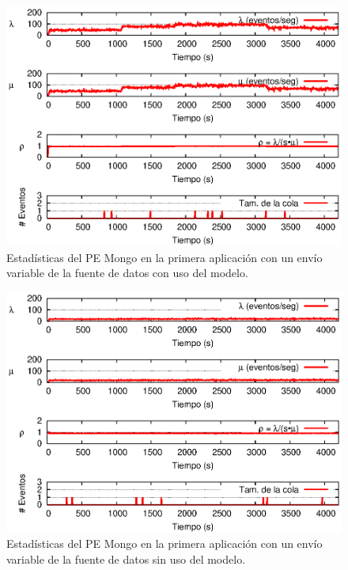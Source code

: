 \begin{figure}[!ht]
\centering
    \includegraphics[scale=1.1]{images/exp/app1/normal/cm/statusMongoPE.eps}
    \caption{Estad\'isticas del PE Mongo en la primera aplicaci\'on con un env\'io variable de la fuente de datos con uso del modelo.}
    \label{fig:app1-normal-statusMongoPE-cm}
\end{figure}

\begin{figure}[!ht]
\centering
    \includegraphics[scale=1.1]{images/exp/app1/normal/sm/statusMongoPE.eps}
    \caption{Estad\'isticas del PE Mongo en la primera aplicaci\'on con un env\'io variable de la fuente de datos sin uso del modelo.}
    \label{fig:app1-normal-statusMongoPE-sm}
\end{figure}


